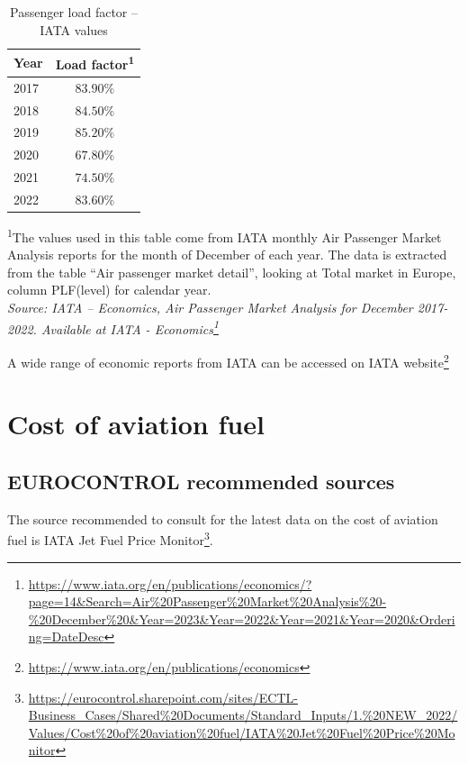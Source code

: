 \documentclass[
  11pt,
  a4paper,
]{book}
\DeclareRobustCommand{\href}[2]{#2\footnote{\url{#1}}}
\begin{document}
\hypertarget{tbl-load-pax-iata}{}
\setlength{\LTpost}{0mm}
\begin{longtable}{lc}
\caption{\label{tbl-load-pax-iata}Passenger load factor -- IATA values }\tabularnewline

\toprule
Year & Load factor\textsuperscript{1} \\ 
\midrule
2017 & $83.90\%$ \\ 
2018 & $84.50\%$ \\ 
2019 & $85.20\%$ \\ 
2020 & $67.80\%$ \\ 
2021 & $74.50\%$ \\ 
2022 & $83.60\%$ \\ 
\bottomrule
\end{longtable}
\begin{minipage}{\linewidth}
\textsuperscript{1}The values used in this table come from IATA monthly Air Passenger Market Analysis reports for the month of December of each year. The data is extracted from the table “Air passenger market detail”, looking at Total market in Europe, column PLF(level) for calendar year.\\
\emph{Source: IATA -- Economics, Air Passenger Market Analysis for December 2017-2022. Available at \href{https://www.iata.org/en/publications/economics/?page=14\&Search=Air\%20Passenger\%20Market\%20Analysis\%20-\%20December\%20\&Year=2023\&Year=2022\&Year=2021\&Year=2020\&Ordering=DateDesc}{IATA - Economics}}\\
\end{minipage}

A wide range of economic reports from IATA can be accessed on
\href{https://www.iata.org/en/publications/economics}{IATA website}

\hypertarget{sec-cost-of-aviation-fuel}{%
\chapter{Cost of aviation fuel}\label{sec-cost-of-aviation-fuel}}

\hypertarget{eurocontrol-recommended-sources-1}{%
\section{EUROCONTROL recommended
sources}\label{eurocontrol-recommended-sources-1}}

The source recommended to consult for the latest data on the cost of
aviation fuel is
\href{https://eurocontrol.sharepoint.com/sites/ECTL-Business_Cases/Shared\%20Documents/Standard_Inputs/1.\%20NEW_2022/Values/Cost\%20of\%20aviation\%20fuel/IATA\%20Jet\%20Fuel\%20Price\%20Monitor}{IATA
Jet Fuel Price Monitor}.
\end{document}
